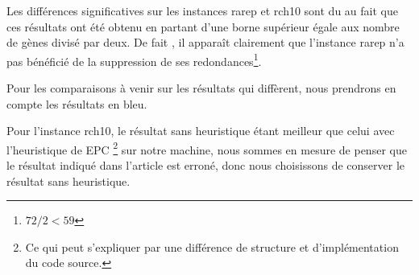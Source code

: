 Les différences significatives sur les instances rarep et rch10 sont du au fait que ces résultats ont été obtenu en partant d'une borne supérieur égale aux nombre de gènes divisé par deux. De fait , il apparaît clairement que l'instance rarep n'a pas bénéficié de la suppression de ses redondances\footnote{$72/2<59$}.

Pour les comparaisons à venir sur les résultats qui diffèrent, nous prendrons en compte les résultats en bleu.

Pour l'instance rch10, le résultat sans heuristique étant meilleur que celui avec l'heuristique de EPC \footnote{Ce qui peut s'expliquer par une différence de structure et d'implémentation du code source.} sur notre machine, nous sommes en mesure de penser que le résultat indiqué dans l'article est erroné, donc nous choisissons de conserver le résultat sans heuristique.


%
%


